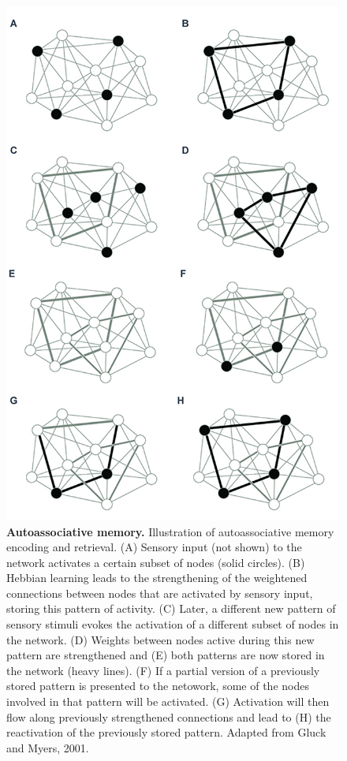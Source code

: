 \documentclass[12pt,a4paper,]{report}
\begin{document}
\begin{figure}[htbp]
\centering
\includegraphics{source/figures/autoassociative.jpg}
\caption{\textbf{Autoassociative memory.} Illustration of
autoassociative memory encoding and retrieval. (A) Sensory input (not
shown) to the network activates a certain subset of nodes (solid
circles). (B) Hebbian learning leads to the strengthening of the
weightened connections between nodes that are activated by sensory
input, storing this pattern of activity. (C) Later, a different new
pattern of sensory stimuli evokes the activation of a different subset
of nodes in the network. (D) Weights between nodes active during this
new pattern are strengthened and (E) both patterns are now stored in the
network (heavy lines). (F) If a partial version of a previously stored
pattern is presented to the netowork, some of the nodes involved in that
pattern will be activated. (G) Activation will then flow along
previously strengthened connections and lead to (H) the reactivation of
the previously stored pattern. Adapted from Gluck and Myers, 2001.
\label{ref_a_figure}}
\end{figure}
\end{document}
